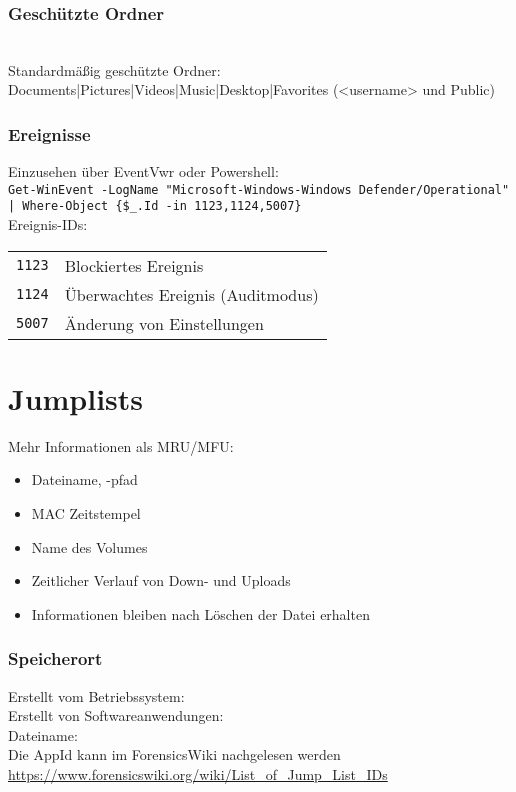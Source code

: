 \subsubsection{Geschützte Ordner}
\\
Standardmäßig geschützte Ordner: Documents|Pictures|Videos|Music|Desktop|Favorites (<username> und Public)\\


\subsubsection{Ereignisse}
Einzusehen über EventVwr
oder Powershell:\\
\texttt{Get-WinEvent -LogName "Microsoft-Windows-Windows Defender/Operational" | Where-Object \{\$\_.Id -in 1123,1124,5007\}}\\
Ereignis-IDs:
\begin{tabular}{@{}p{\the\MyLen}%
		@{}p{\linewidth-\the\MyLen}@{}}
	\texttt{1123} & Blockiertes Ereignis\\
	\texttt{1124} & Überwachtes Ereignis (Auditmodus)\\
	\texttt{5007} & Änderung von Einstellungen\\
\end{tabular}


\section{Jumplists}
Mehr Informationen als MRU/MFU:
\begin{itemize}[leftmargin=*]
	\item Dateiname, -pfad
	\item MAC Zeitstempel
	\item Name des Volumes
	\item Zeitlicher Verlauf von Down- und Uploads
	\item Informationen bleiben nach Löschen der Datei erhalten
\end{itemize}

\subsubsection{Speicherort}
Erstellt vom Betriebssystem: \\
Erstellt von Softwareanwendungen: \\
Dateiname: \\
Die AppId kann im ForensicsWiki nachgelesen werden \url{https://www.forensicswiki.org/wiki/List_of_Jump_List_IDs}

